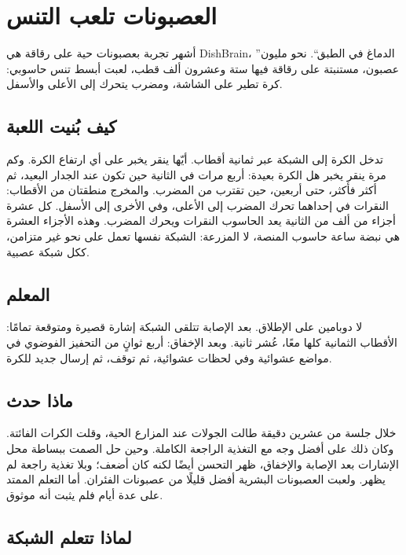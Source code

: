 \chapter{العصبونات تلعب التنس}

أشهر تجربة بعصبونات حية على رقاقة هي \foreignlanguage{english}{DishBrain}، ”الدماغ في الطبق“. نحو مليون عصبون، مستنبتة على رقاقة فيها ستة وعشرون ألف قطب، لعبت أبسط تنس حاسوبي: كرة تطير على الشاشة، ومضرب يتحرك إلى الأعلى والأسفل.

\section*{كيف بُنيت اللعبة}

تدخل الكرة إلى الشبكة عبر ثمانية أقطاب. أيّها ينقر يخبر على أي ارتفاع الكرة. وكم مرة ينقر يخبر هل الكرة بعيدة: أربع مرات في الثانية حين تكون عند الجدار البعيد، ثم أكثر فأكثر، حتى أربعين، حين تقترب من المضرب. والمخرج منطقتان من الأقطاب: النقرات في إحداهما تحرك المضرب إلى الأعلى، وفي الأخرى إلى الأسفل. كل عشرة أجزاء من ألف من الثانية يعد الحاسوب النقرات ويحرك المضرب. وهذه الأجزاء العشرة هي نبضة ساعة حاسوب المنصة، لا المزرعة: الشبكة نفسها تعمل على نحو غير متزامن، ككل شبكة عصبية.


\section*{المعلم}

لا دوبامين على الإطلاق. بعد الإصابة تتلقى الشبكة إشارة قصيرة ومتوقعة تمامًا: الأقطاب الثمانية كلها معًا، عُشر ثانية. وبعد الإخفاق: أربع ثوانٍ من التحفيز الفوضوي في مواضع عشوائية وفي لحظات عشوائية، ثم توقف، ثم إرسال جديد للكرة.

\section*{ماذا حدث}

خلال جلسة من عشرين دقيقة طالت الجولات عند المزارع الحية، وقلت الكرات الفائتة. وكان ذلك على أفضل وجه مع التغذية الراجعة الكاملة. وحين حل الصمت ببساطة محل الإشارات بعد الإصابة والإخفاق، ظهر التحسن أيضًا لكنه كان أضعف؛ وبلا تغذية راجعة لم يظهر. ولعبت العصبونات البشرية أفضل قليلًا من عصبونات الفئران. أما التعلم الممتد على عدة أيام فلم يثبت أنه موثوق.

\section*{لماذا تتعلم الشبكة}

